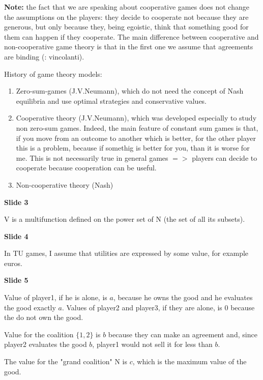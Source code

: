 \documentclass[pt11,a4paper,twoside,reqno,openright]{paper}
\begin{document}

\bigskip
\noindent \textbf{Note:} the fact that we are speaking about cooperative 
games does not change the assumptions on the players: they decide to 
cooperate not because they are generous, but only because they, being 
egoistic, think that something good for them can happen if they cooperate. 
The main difference between cooperative and non-cooperative game theory is that 
in the first one we assume that agreements are binding (: vincolanti).

\noindent History of game theory models:
\begin{enumerate}
	\item Zero-sum-games (J.V.Neumann), which do not need the concept of 
		Nash equilibria and use optimal strategies and conservative 
		values.
	\item Cooperative theory (J.V.Neumann), which was developed especially 
		to study non zero-sum games. Indeed, the main feature of 
		constant sum games is that, if you move from an outcome to 
		another which is better, for the other player this is a 
		problem, because if somethig is better for you, than it is 
		worse for me. This is not necessarily true in general games 
		$=>$ players can decide to cooperate because cooperation can 
		be useful.
	\item Non-cooperative theory (Nash)
\end{enumerate}

\bigskip
\noindent \textbf{Slide 3}

\noindent V is a multifunction defined on the power set of N (the set of all 
its subsets).

\bigskip
\noindent \textbf{Slide 4}

\noindent In TU games, I assume that utilities are expressed by some value, 
for example euros.

\bigskip
\noindent \textbf{Slide 5}

\noindent Value of player1, if he is alone, is $a$, because he owns the 
good and he evaluates the good exactly $a$. Values of player2 and player3, 
if they are alone, is 0 because the do not own the good.

\noindent Value for the coalition $\{1,2\}$ is $b$ because they can make an 
agreement and, since player2 evaluates the good $b$, player1 would not 
sell it for less than $b$.

\noindent The value for the "grand coalition" N is $c$, which is the maximum 
value of the good.
\end{document}
